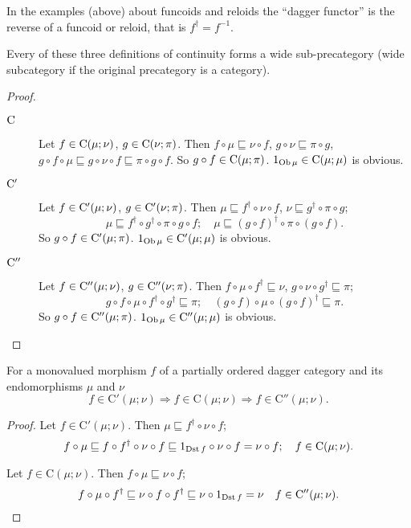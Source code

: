 \begin{rem}
In the examples (above) about funcoids and reloids the ``dagger functor''
is the reverse of a funcoid or reloid, that is $f^{\dagger}=f^{-1}$.\end{rem}
\begin{prop}
Every of these three definitions of continuity forms a wide sub-precategory
(wide subcategory if the original precategory is a category).\end{prop}
\begin{proof}
~
\begin{description}
\item [{$\mathrm{C}$}] Let $f\in\mathrm{C}(\mu;\nu)$, $g\in\mathrm{C}(\nu;\pi)$.
Then $f\circ\mu\sqsubseteq\nu\circ f$, $g\circ\nu\sqsubseteq\pi\circ g$,
$g\circ f\circ\mu\sqsubseteq g\circ\nu\circ f\sqsubseteq\pi\circ g\circ f$.
So $g\circ f\in\mathrm{C}(\mu;\pi)$. $1_{\operatorname{Ob}\mu}\in\mathrm{C}(\mu;\mu)$
is obvious.
\item [{$\mathrm{C}'$}] Let $f\in\mathrm{C}'(\mu;\nu)$, $g\in\mathrm{C}'(\nu;\pi)$.
Then $\mu\sqsubseteq f^{\dagger}\circ\nu\circ f$, $\nu\sqsubseteq g^{\dagger}\circ\pi\circ g$;
\[
\mu\sqsubseteq f^{\dagger}\circ g^{\dagger}\circ\pi\circ g\circ f;\quad\mu\sqsubseteq(g\circ f)^{\dagger}\circ\pi\circ(g\circ f).
\]
So $g\circ f\in\mathrm{C}'(\mu;\pi)$. $1_{\operatorname{Ob}\mu}\in\mathrm{C}'(\mu;\mu)$
is obvious.
\item [{$\mathrm{C}''$}] Let $f\in\mathrm{C}''(\mu;\nu)$, $g\in\mathrm{C}''(\nu;\pi)$.
Then $f\circ\mu\circ f^{\dagger}\sqsubseteq\nu$, $g\circ\nu\circ g^{\dagger}\sqsubseteq\pi$;
\[
g\circ f\circ\mu\circ f^{\dagger}\circ g^{\dagger}\sqsubseteq\pi;\quad(g\circ f)\circ\mu\circ(g\circ f)^{\dagger}\sqsubseteq\pi.
\]
So $g\circ f\in\mathrm{C}''(\mu;\pi)$. $1_{\operatorname{Ob}\mu}\in\mathrm{C}''(\mu;\mu)$
is obvious.
\end{description}
\end{proof}
\begin{prop}
For a monovalued morphism $f$ of a partially ordered dagger category
and its endomorphisms $\mu$ and $\nu$ 
\[
f\in\mathrm{C}'(\mu;\nu)\Rightarrow f\in\mathrm{C}(\mu;\nu)\Rightarrow f\in\mathrm{C}''(\mu;\nu).
\]
\end{prop}
\begin{proof}
Let $f\in\mathrm{C}'(\mu;\nu)$. Then $\mu\sqsubseteq f^{\dagger}\circ\nu\circ f$;
\[
f\circ\mu\sqsubseteq f\circ f^{\dagger}\circ\nu\circ f\sqsubseteq1_{\operatorname{Dst} f}\circ\nu\circ f=\nu\circ f;\quad f\in\mathrm{C}(\mu;\nu).
\]


Let $f\in\mathrm{C}(\mu;\nu)$. Then $f\circ\mu\sqsubseteq\nu\circ f$;
\[
f\circ\mu\circ f^{\dagger}\sqsubseteq\nu\circ f\circ f^{\dagger}\sqsubseteq\nu\circ1_{\operatorname{Dst} f}=\nu\quad f\in\mathrm{C}''(\mu;\nu).
\]
\end{proof}

